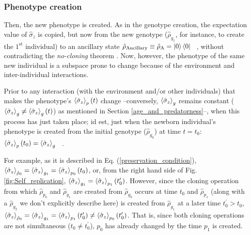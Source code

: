 \documentclass[11pt]{article}
\numberwithin{equation}{section} %
\numberwithin{figure}{section} %
\begin{document}
\subsubsection{Phenotype creation} \label{phenotype_creation}

Then, the new phenotype is created. As in the genotype creation, the expectation value of $\hat{\sigma}_z$ is copied, but now from the new genotype ($\hat{\rho}_{g_1}$, for instance, to create the $1^\textrm{st}$ individual) to an ancillary state $\hat{\rho}_{\textrm{Ancillary}}\equiv\hat{\rho}_\textrm{A}=\ket{0}\bra{0}\,\,\,$ \cite[p.~2, Eq.~(3c)]{AL_in_QT}, without contradicting the \emph{no-cloning} theorem \cite[p.~2, l.~17-19]{Bio_Cloning}. Now, however, the phenotype of the same new individual is a subspace prone to change because of the environment and inter-individual interactions.

Prior to any interaction (with the environment and/or other individuals) that makes the phenotype's $\braket{\hat{\sigma}_z}_p(t)$ change --conversely, $\braket{\hat{\sigma}_z}_g$ remains constant ($\braket{\hat{\sigma}_z}_g\neq\braket{\hat{\sigma}_z}_g(t)$) as mentioned in Section \ref{age_and_predatorness}--, when this process has just taken place; id est, just when the newborn individual's phenotype is created from the initial genotype ($\hat{\rho}_{g_0}$) at time $t=t_0$: $\braket{\hat{\sigma}_z}_p(t_0)=\braket{\hat{\sigma}_z}_g$ $\,$  \cite[p.~2, l.~29-30]{AL_in_QT}. 

For example, as it is described in Eq.  (\ref{preservation_condition}), $\braket{\hat{\sigma}_z}_{\hat{\rho}_0} = \braket{\hat{\sigma}_z}_{g_1} =\braket{\hat{\sigma}_z}_{p_0}(t_0)$, or, from the right hand side of Fig. \ref{fig:Self_replication}, $\braket{\hat{\sigma}_z}_{g_1} =\braket{\hat{\sigma}_z}_{p_1}(t_0^\prime)$. However, since the cloning operation from which $\hat{\rho}_{p_0}$ and $\hat{\rho}_{g_1}$ are created from $\hat{\rho}_{g_0}$ occurs at time $t_0$ and $\hat{\rho}_{p_1}$ (along with a $\hat{\rho}_{g_2}$ we don't explicitly describe here) is created from $\hat{\rho}_{g_1}$ at a later time $t_0^\prime>t_0$, $\braket{\hat{\sigma}_z}_{\hat{\rho}_0} = \braket{\hat{\sigma}_z}_{g_1} =\braket{\hat{\sigma}_z}_{p_1}(t_0^\prime)\neq\braket{\hat{\sigma}_z}_{p_0}(t_0^\prime)$. That is, since both cloning operations are not simultaneous ($t_0\neq t_0^\prime$), $p_0$ has already changed by the time $p_1$ is created.
\end{document}

